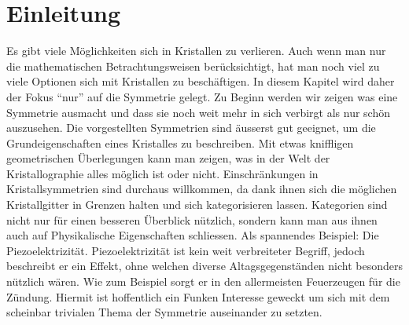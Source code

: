 \section{Einleitung}
Es gibt viele Möglichkeiten sich in Kristallen zu verlieren.
Auch wenn man nur die mathematischen Betrachtungsweisen berücksichtigt, 
hat man noch viel zu viele Optionen sich mit Kristallen zu beschäftigen.
In diesem Kapitel wird daher der Fokus ``nur'' auf die Symmetrie gelegt.
Zu Beginn werden wir zeigen was eine Symmetrie ausmacht und 
dass sie noch weit mehr in sich verbirgt als nur schön auszusehen.
Die vorgestellten Symmetrien sind äusserst gut geeignet, 
um die Grundeigenschaften eines Kristalles zu beschreiben.
Mit etwas kniffligen geometrischen Überlegungen kann man zeigen, 
was in der Welt der Kristallographie alles möglich ist oder nicht.
Einschränkungen in Kristallsymmetrien sind durchaus willkommen, 
da dank ihnen sich die möglichen Kristallgitter in Grenzen halten
und sich kategorisieren lassen. 
Kategorien sind nicht nur für einen besseren Überblick nützlich, 
sondern kann man aus ihnen auch auf Physikalische Eigenschaften schliessen. 
Als spannendes Beispiel: Die Piezoelektrizität.
Piezoelektrizität ist kein weit verbreiteter Begriff, 
jedoch beschreibt er ein Effekt, ohne welchen diverse Altagsgegenständen nicht besonders nützlich wären. 
Wie zum Beispiel sorgt er in den allermeisten Feuerzeugen für die Zündung.
Hiermit ist hoffentlich ein Funken Interesse geweckt 
um sich mit dem scheinbar trivialen Thema der Symmetrie auseinander zu setzten.



